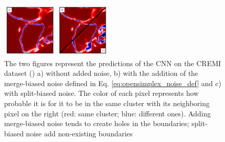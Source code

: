% 
\begin{figure}
\centering

        \includegraphics[width=0.48\textwidth,trim=0.1in 0.0in 0.05in 0.0in,clip]{figs/noisy_affs_comparison.png}
   
    \caption{The two figures represent the predictions of the CNN on the CREMI dataset () a) without added noise, b) with the addition of the merge-biased noise defined in Eq. \ref{eq:opensimplex_noise_def} and c) with split-biased noise. The color of each pixel represents how probable it is for it to be in the same cluster with its neighboring pixel on the right (red: same cluster; blue: different ones). Adding merge-biased noise tends to create holes in the boundaries; split-biased noise add non-existing boundaries }
    \label{fig:noisy_affs}
\end{figure}%


